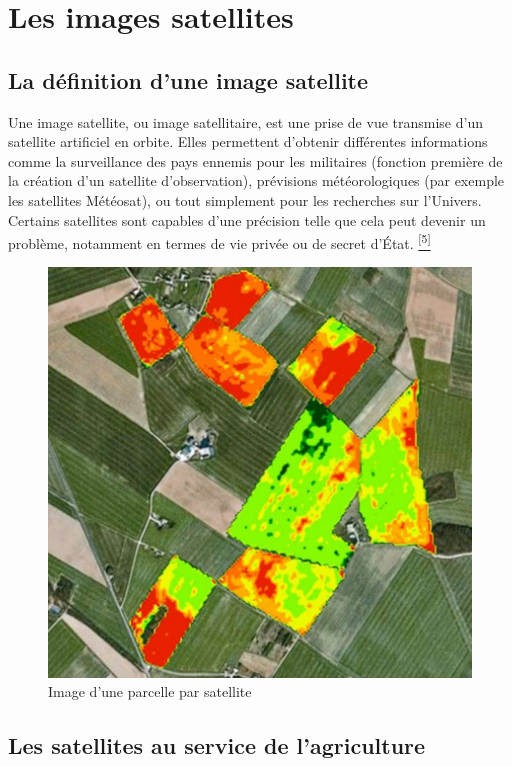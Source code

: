 \documentclass[12pt, openany]{report}
\begin{document}
\section{Les images satellites}
\subsection{La définition d'une image satellite}

Une image satellite, ou image satellitaire, est une prise de vue transmise d'un satellite artificiel en orbite. Elles permettent d'obtenir différentes informations comme la surveillance des pays ennemis pour les militaires (fonction première de la création d'un satellite d'observation), prévisions météorologiques (par exemple les satellites Météosat), ou tout simplement pour les recherches sur l'Univers. Certains satellites sont capables d'une précision telle que cela peut devenir un problème, notamment en termes de vie privée ou de secret d'État. \hyperref[sec:refs]{\textsuperscript{[5]}}
\begin{figure}[hp]
\centering
\includegraphics[scale=0.5]{img.jpg}
\caption{Image d'une parcelle par satellite}
\end{figure}

\subsection{Les satellites au service de l'agriculture}
\end{document}
